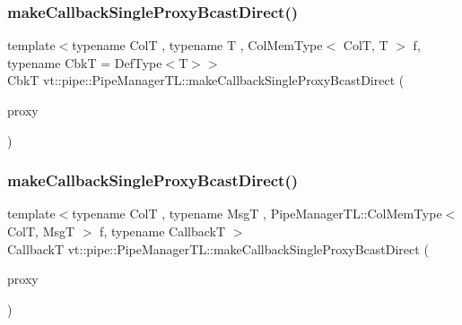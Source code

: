 \mbox{\label{structvt_1_1pipe_1_1_pipe_manager_t_l_aff70024da9ee15ef2c935ca21d18a80d}} 
\subsubsection{\texorpdfstring{make\+Callback\+Single\+Proxy\+Bcast\+Direct()}{makeCallbackSingleProxyBcastDirect()}\hspace{0.1cm}{\footnotesize\ttfamily [2/3]}}
{\footnotesize\ttfamily template$<$typename ColT , typename T , Col\+Mem\+Type$<$ Col\+T, T $>$ f, typename CbkT  = Def\+Type$<$\+T$>$$>$ \\
CbkT vt\+::pipe\+::\+Pipe\+Manager\+T\+L\+::make\+Callback\+Single\+Proxy\+Bcast\+Direct (\begin{DoxyParamCaption}\item[{\hyperlink{structvt_1_1pipe_1_1_pipe_manager_t_l_af56c58cad882496e35f01227d4da3898}{Col\+Proxy\+Type}$<$ ColT $>$}]{proxy }\end{DoxyParamCaption})}

\mbox{\label{structvt_1_1pipe_1_1_pipe_manager_t_l_a41fec001a4e698cb2bac888a6a48d606}} 
\subsubsection{\texorpdfstring{make\+Callback\+Single\+Proxy\+Bcast\+Direct()}{makeCallbackSingleProxyBcastDirect()}\hspace{0.1cm}{\footnotesize\ttfamily [3/3]}}
{\footnotesize\ttfamily template$<$typename ColT , typename MsgT , Pipe\+Manager\+T\+L\+::\+Col\+Mem\+Type$<$ Col\+T, Msg\+T $>$ f, typename CallbackT $>$ \\
CallbackT vt\+::pipe\+::\+Pipe\+Manager\+T\+L\+::make\+Callback\+Single\+Proxy\+Bcast\+Direct (\begin{DoxyParamCaption}\item[{\hyperlink{structvt_1_1pipe_1_1_pipe_manager_t_l_af56c58cad882496e35f01227d4da3898}{Col\+Proxy\+Type}$<$ ColT $>$}]{proxy }\end{DoxyParamCaption})}

